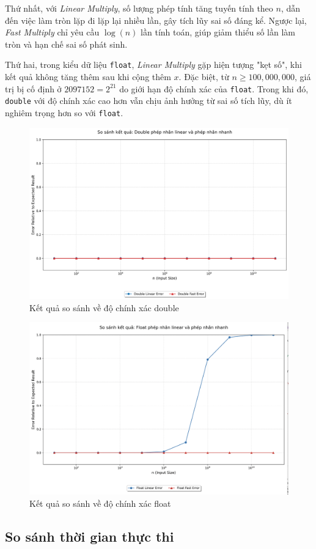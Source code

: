 Thứ nhất, với \textit{Linear Multiply}, số lượng phép tính tăng tuyến tính theo $n$, dẫn đến việc làm tròn lặp đi lặp lại nhiều lần, gây tích lũy sai số đáng kể. Ngược lại, \textit{Fast Multiply} chỉ yêu cầu $\log(n)$ lần tính toán, giúp giảm thiểu số lần làm tròn và hạn chế sai số phát sinh.

Thứ hai, trong kiểu dữ liệu \texttt{float}, \textit{Linear Multiply} gặp hiện tượng "kẹt số", khi kết quả không tăng thêm sau khi cộng thêm $x$. Đặc biệt, từ $n \geq 100,000,000$, giá trị bị cố định ở $2097152 = 2^{21}$ do giới hạn độ chính xác của \texttt{float}. Trong khi đó, \texttt{double} với độ chính xác cao hơn vẫn chịu ảnh hưởng từ sai số tích lũy, dù ít nghiêm trọng hơn so với \texttt{float}.
\begin{figure}[h]
    \centering
    \includegraphics[width=0.7\linewidth]{images/double-percision.png}
    \caption{Kết quả so sánh về độ chính xác double}
\end{figure}
\begin{figure}[h]
    \centering
    \includegraphics[width=0.7\linewidth]{images/float-percision.png}
    \caption{Kết quả so sánh về độ chính xác float}
\end{figure}

\subsection{So sánh thời gian thực thi}

